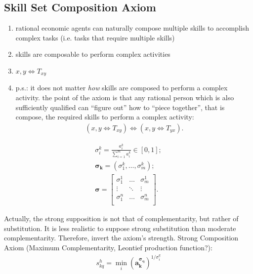 \documentclass{elsarticle} %
\begin{document}
\subsection{Skill Set Composition Axiom}
\begin{enumerate}
    \item rational economic agents can naturally compose multiple skills to accomplish
          complex tasks (i.e. tasks that require multiple skills)
    \item skills are composable to perform complex activities
    \item $x,y \iff T_{xy}$
    \item p.s.: it does not matter \textit{how} skills are composed to perform a complex
          activity. the point of the axiom is that any rational person which is also
          sufficiently qualified can ``figure out'' how to ``piece together'', that is
          compose, the required skills to perform a complex activity:
          \begin{gather*}
              (x,y \iff T_{xy}) \iff (x,y \iff T_{yx})
              .
          \end{gather*}
\end{enumerate}

\begin{gather*}
    \sigma_{i}^{k} = 
    \frac{
        a_{i}^{k}
        }{
            \sum_{i=1}^{m}{
                a_{i}^{k}
            }
        }
        \in [0,1]
        ;\\
    \boldsymbol{\sigma_{k}} = 
    (\sigma_{1}^{k}, \dots, \sigma_{m}^{k})
    ;\\
    \boldsymbol{\sigma} =
    \begin{bmatrix}
        \sigma_{1}^{1} & \hdots & \sigma_{m}^{1} \\
        \vdots    & \ddots & \vdots    \\
        \sigma_{1}^{n} & \hdots & \sigma_{m}^{n} \\
    \end{bmatrix}
    .
\end{gather*}

Actually, the strong supposition is not that of complementarity, but rather of substitution. It is less realistic to suppose strong substitution than moderate complementarity. Therefore, invert the axiom's strength.
Strong Composition Axiom (Maximum Complementarity, Leontief production function?):
\begin{gather*}
    s_{kq}^{h} = 
    {\min_{i}\left(
        {\boldsymbol{a_{k}^ {\boldsymbol{\sigma_{q}}}}}
    \right)} ^ {1 / \sigma_{i}^{q}}
\end{gather*}
\end{document}
